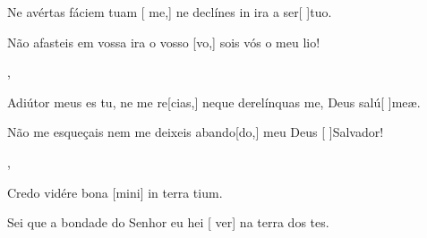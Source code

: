 {    {\item {}Ne avértas fáciem tuam [ me,] ne declínes in ira a ser[ ]{tu}o.~\Responsorium}%
        {\item {}Não afasteis em vossa ira o vosso [vo,] sois vós o meu lio!~\Responsorium},
    {\item {}Adiútor meus es tu, ne me re[cias,] neque derelínquas me, Deus salú[ ]{me}æ.~\Responsorium}%
        {\item {}Não me esqueçais nem me deixeis abando[do,] meu Deus [ ]{Sal}vador!~\Responsorium},
    {\item {}Credo vidére bona [mini] in terra tium.~\Responsorium}%
        {\item {}Sei que a bondade do Senhor eu hei [ ver] na terra dos tes.~\Responsorium}
}